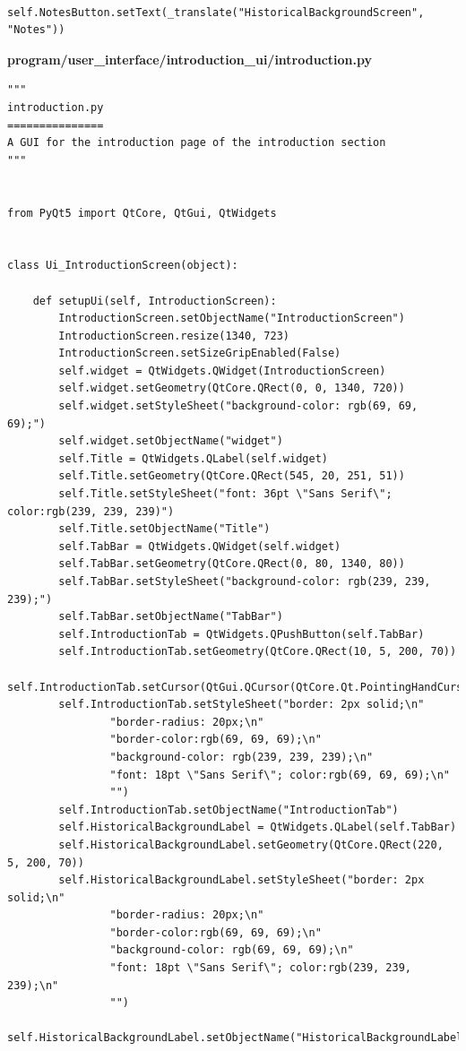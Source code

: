 \documentclass{article}
\begin{document}
\begin{lstlisting}
        self.NotesButton.setText(_translate("HistoricalBackgroundScreen", "Notes"))
\end{lstlisting}

\textbf{program/user\_interface/introduction\_ui/introduction.py}
\begin{lstlisting}
"""
introduction.py
===============
A GUI for the introduction page of the introduction section
"""


from PyQt5 import QtCore, QtGui, QtWidgets


class Ui_IntroductionScreen(object):

    def setupUi(self, IntroductionScreen):
        IntroductionScreen.setObjectName("IntroductionScreen")
        IntroductionScreen.resize(1340, 723)
        IntroductionScreen.setSizeGripEnabled(False)
        self.widget = QtWidgets.QWidget(IntroductionScreen)
        self.widget.setGeometry(QtCore.QRect(0, 0, 1340, 720))
        self.widget.setStyleSheet("background-color: rgb(69, 69, 69);")
        self.widget.setObjectName("widget")
        self.Title = QtWidgets.QLabel(self.widget)
        self.Title.setGeometry(QtCore.QRect(545, 20, 251, 51))
        self.Title.setStyleSheet("font: 36pt \"Sans Serif\"; color:rgb(239, 239, 239)")
        self.Title.setObjectName("Title")
        self.TabBar = QtWidgets.QWidget(self.widget)
        self.TabBar.setGeometry(QtCore.QRect(0, 80, 1340, 80))
        self.TabBar.setStyleSheet("background-color: rgb(239, 239, 239);")
        self.TabBar.setObjectName("TabBar")
        self.IntroductionTab = QtWidgets.QPushButton(self.TabBar)
        self.IntroductionTab.setGeometry(QtCore.QRect(10, 5, 200, 70))
        self.IntroductionTab.setCursor(QtGui.QCursor(QtCore.Qt.PointingHandCursor))
        self.IntroductionTab.setStyleSheet("border: 2px solid;\n"
                "border-radius: 20px;\n"
                "border-color:rgb(69, 69, 69);\n"
                "background-color: rgb(239, 239, 239);\n"
                "font: 18pt \"Sans Serif\"; color:rgb(69, 69, 69);\n"
                "")
        self.IntroductionTab.setObjectName("IntroductionTab")
        self.HistoricalBackgroundLabel = QtWidgets.QLabel(self.TabBar)
        self.HistoricalBackgroundLabel.setGeometry(QtCore.QRect(220, 5, 200, 70))
        self.HistoricalBackgroundLabel.setStyleSheet("border: 2px solid;\n"
                "border-radius: 20px;\n"
                "border-color:rgb(69, 69, 69);\n"
                "background-color: rgb(69, 69, 69);\n"
                "font: 18pt \"Sans Serif\"; color:rgb(239, 239, 239);\n"
                "")
        self.HistoricalBackgroundLabel.setObjectName("HistoricalBackgroundLabel")

\end{lstlisting}
\end{document}
